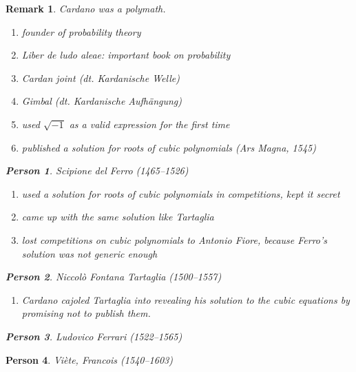 \documentclass{article}
\newcounter{lecref}[section]
\numberwithin{lecref}{section}
\newtheorem{remark}[lecref]{Remark}
\newtheorem*{person}{Person}
\begin{document}
\begin{remark}
  Cardano was a polymath.
  \begin{enumerate}
    \item founder of probability theory
    \item \emph{Liber de ludo aleae}: important book on probability
    \item Cardan joint (dt. \foreignlanguage{german}{Kardanische Welle})
    \item Gimbal (dt. \foreignlanguage{german}{Kardanische Aufh\"angung})
    \item used $\sqrt{-1}$ as a valid expression for the first time
    \item published a solution for roots of cubic polynomials (Ars Magna, 1545)
  \end{enumerate}

  \begin{person}
    Scipione del Ferro (1465--1526)
  \end{person}

  \begin{enumerate}
    \item used a solution for roots of cubic polynomials in competitions, kept it secret
    \item came up with the same solution like Tartaglia
    \item lost competitions on cubic polynomials to Antonio Fiore, because Ferro's solution was not generic enough
  \end{enumerate}

  \begin{person}
    Niccol\`o Fontana Tartaglia (1500--1557)
  \end{person}

  \begin{enumerate}
    \item Cardano cajoled Tartaglia into revealing his solution to the cubic equations by promising not to publish them.
  \end{enumerate}

  \begin{person}
    Ludovico Ferrari (1522--1565)
  \end{person}
\end{remark}

\begin{person}
  Vi\`ete, Francois (1540--1603)
\end{person}
\end{document}
